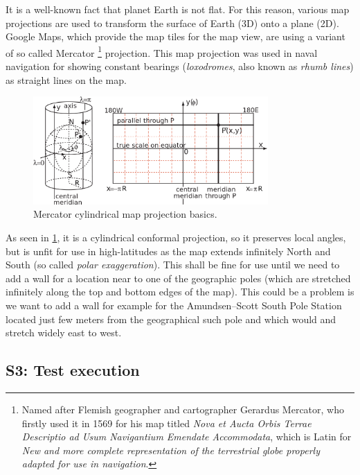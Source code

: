 \documentclass[11pt]{book}
\begin{document}
It is a well-known fact that planet Earth is not flat. For this reason, various map projections are used to transform the surface of Earth (3D) onto a plane (2D). Google Maps, which provide the map tiles for the map view, are using a variant of so called Mercator \footnote{Named after Flemish geographer and cartographer Gerardus Mercator, who firstly used it in 1569 for his map titled \emph{Nova et Aucta Orbis Terrae Descriptio ad Usum Navigantium Emendate Accommodata}, which is Latin for \emph{New and more complete representation of the terrestrial globe properly adapted for use in navigation}.} projection. This map projection was used in naval navigation for showing constant bearings (\emph{loxodromes}, also known as \emph{rhumb lines}) as straight lines on the map. \cite{progonos:mercator,radicalcartography} 

\begin{figure}[H]
    \centering
    \includegraphics[width=0.8\textwidth]{Figures/Prestudy/mercator.png}
    \caption{Mercator cylindrical map projection basics. \cite{wikipedia:mercator}}
    \label{fig:mercator}
\end{figure}

As seen in \ref{fig:mercator}, it is a cylindrical conformal projection, so it preserves local angles, but is unfit for use in high-latitudes as the map extends infinitely North and South (so called \emph{polar exaggeration}). This shall be fine for use until we need to add a wall for a location near to one of the geographic poles (which are stretched infinitely along the top and bottom edges of the map). This could be a problem is we want to add a wall for example for the Amundsen–Scott South Pole Station located just few meters from the geographical such pole and which would and stretch widely east to west. \cite{progonos:mercator,radicalcartography} 


\subsection{S3: Test execution}
\end{document}
